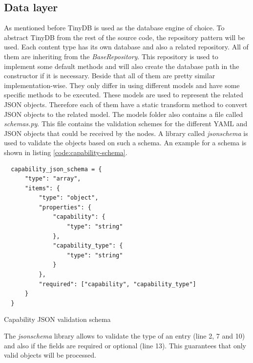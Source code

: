 \subsection{Data layer}
\label{subsection:impl-data-layer}
As mentioned before TinyDB is used as the database engine of choice.
To abstract TinyDB from the rest of the source code, the repository pattern will be used.
Each content type has its own database and also a related repository.
All of them are inheriting from the \textit{BaseRepository}.
This repository is used to implement some default methods and will also create the database path in the constructor if it is necessary.
Beside that all of them are pretty similar implementation-wise.
They only differ in using different models and have some specific methods to be executed.
These models are used to represent the related \ac{JSON} objects.
Therefore each of them have a static transform method to convert \ac{JSON} objects to the related model.
The models folder also contains a file called \textit{schemas.py}.
This file contains the validation schemes for the different \ac{YAML} and \ac{JSON} objects that could be received by the nodes.
A library called \textit{jsonschema} is used to validate the objects based on such a schema.
An example for a schema is shown in listing \ref{code:capability-schema}.
\begin{listing}[H]
  \begin{verbatim}
  capability_json_schema = {
      "type": "array",
      "items": {
          "type": "object",
          "properties": {
              "capability": {
                  "type": "string"
              },
              "capability_type": {
                  "type": "string"
              }
          },
          "required": ["capability", "capability_type"]
      }
  }
  \end{verbatim}
  \caption{Capability JSON validation schema}
  \label{code:capability-schema}
\end{listing}
The \textit{jsonschema} library allows to validate the type of an entry (line 2, 7 and 10) and also if the fields are required or optional (line 13).
This guarantees that only valid objects will be processed.

